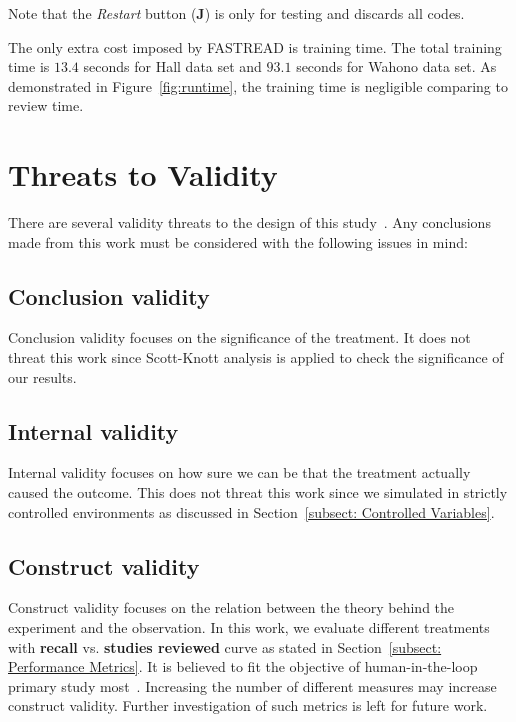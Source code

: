 \documentclass[final,twocolumn,5p]{elsarticle}
\theoremstyle{break}
\begin{document}
Note that the \textit{Restart} button (\textbf{J}) is only for testing and discards all codes.


The only extra cost imposed by FASTREAD is training time. The total training time is $13.4$ seconds for Hall data set and $93.1$ seconds for Wahono data set. As demonstrated in Figure~\ref{fig:runtime}, the training time is negligible comparing to review time.





\section{Threats to Validity}
\label{sect: Threats to Validity}

There are several validity threats to the design of this study~\cite{feldt2010validity}. Any conclusions made from this work must be considered with the following issues in mind:

\subsection{Conclusion validity}

Conclusion validity focuses on the significance of the treatment. It does not threat this work since Scott-Knott analysis is applied to check the significance of our results.

\subsection{Internal validity}

Internal validity focuses on how sure we can be that the treatment
actually caused the outcome. This does not threat this work since we simulated in strictly controlled environments as discussed in Section~\ref{subsect: Controlled Variables}.

\subsection{Construct validity}

Construct validity focuses on the relation between the theory
behind the experiment and the observation. In this work, we evaluate different treatments with \textbf{recall} vs. \textbf{studies reviewed} curve as stated in Section~\ref{subsect: Performance Metrics}. It is believed to fit the objective of human-in-the-loop primary study most~\cite{tredennick2015,cormack2015autonomy,cormack2014evaluation}. Increasing the number of different measures may increase construct validity. Further investigation of such metrics is left for future work.
\end{document}
